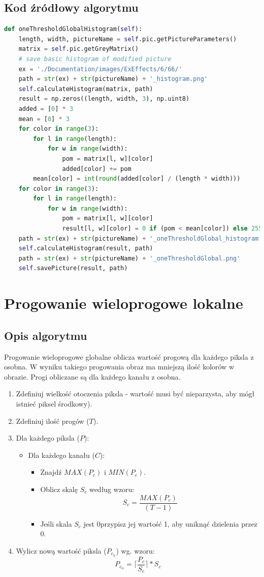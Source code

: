 \documentclass[a4paper,12pt, titlepage]{report}
\begin{document}
\subsection*{Kod źródłowy algorytmu}
\begin{lstlisting}[language=Python]
def oneThresholdGlobalHistogram(self):
    length, width, pictureName = self.pic.getPictureParameters()
    matrix = self.pic.getGreyMatrix()
    # save basic histogram of modified picture
    ex = './Documentation/images/ExEffects/6/66/'
    path = str(ex) + str(pictureName) + '_histogram.png'
    self.calculateHistogram(matrix, path)
    result = np.zeros((length, width, 3), np.uint8)
    added = [0] * 3
    mean = [0] * 3
    for color in range(3):
        for l in range(length):
            for w in range(width):
                pom = matrix[l, w][color]
                added[color] += pom
        mean[color] = int(round(added[color] / (length * width)))
    for color in range(3):
        for l in range(length):
            for w in range(width):
                pom = matrix[l, w][color]
                result[l, w][color] = 0 if (pom < mean[color]) else 255
    path = str(ex) + str(pictureName) + '_oneThresholdGlobal_histogram.png'
    self.calculateHistogram(result, path)
    path = str(ex) + str(pictureName) + '_oneThresholdGlobal.png'
    self.savePicture(result, path)
\end{lstlisting}

\section{Progowanie wieloprogowe lokalne}
\subsection*{Opis algorytmu}
\par Progowanie wieloprogowe globalne oblicza wartość progową dla każdego piksla z osobna. W wyniku takiego progowania obraz ma mniejszą ilość kolorów w obrazie. Progi obliczane są dla każdego kanału z osobna.
\begin{enumerate}
\item Zdefiniuj wielkość otoczenia piksla - wartość musi być nieparzysta, aby mógł istnieć piksel środkowy).
\item Zdefiniuj ilość progów (\(T\)).
\item Dla każdego piksla (\(P\)):
\begin{itemize}
\item Dla każdego kanału (\(C\)):
\begin{itemize}
\item Znajdź \(MAX(P_{c})\) i \(MIN(P_{c})\).
\item Oblicz skalę \(S_{c}\) według wzoru: \[S_{c}=\frac{MAX(P_{c})}{(T-1)}\]
\item Jeśli skala \(S_{c}\) jest 0przypisz jej wartość 1, aby uniknąć dzielenia przez 0.
\end{itemize}
\end{itemize}
\item Wylicz nową wartość piksla (\(P_{c_{n}}\)) wg. wzoru: \[P_{c_{n}}=\Big\lceil\frac{P_{c}}{S_{c}}\Big\rceil*S_{c}\]
\end{enumerate}
\end{document}
